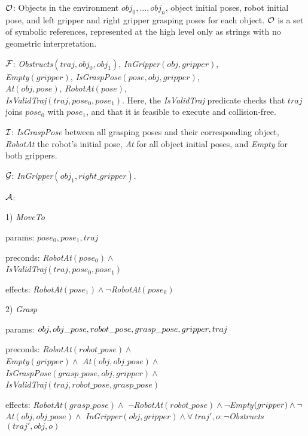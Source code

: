\begin{tightlist}
\item[$\mathcal{O}$:] Objects in the environment $obj_{0}, ..., obj_{n}$, object initial poses,
robot initial pose, and left gripper and right gripper grasping poses
for each object. $\mathcal{O}$ is a set of symbolic references, represented at the high
level only as strings with no geometric interpretation.

\item[$\mathcal{F}$:] \emph{Obstructs}$(traj, obj_{0}, obj_{1})$, \emph{InGripper}$(obj, gripper)$,\\\emph{Empty}$(gripper)$,
\emph{IsGraspPose}$(pose, obj, gripper)$,\\\emph{At}$(obj, pose)$, \emph{RobotAt}$(pose)$,\\
\emph{IsValidTraj}$(traj, pose_{0}, pose_{1})$. Here, the \emph{IsValidTraj} predicate checks that $traj$
joins $pose_{0}$ with $pose_{1}$, and that it is feasible to execute and
collision-free.

\item[$\mathcal{I}$:] \emph{IsGraspPose} between all grasping poses and their corresponding object,
\emph{RobotAt} the robot's initial pose, \emph{At} for all object initial poses, and
\emph{Empty} for both grippers.

\item[$\mathcal{G}$:] \emph{InGripper}$(obj_{1}, right\_gripper)$.

\item[$\mathcal{A}$:]
\begin{tightlist}
\item[1)] \emph{MoveTo}
  \begin{tightlist}
  \item[params:]$pose_{0}, pose_{1}, traj$
  \item[preconds:]\emph{RobotAt}$(pose_{0}) \wedge$\\ \emph{IsValidTraj}$(traj, pose_{0}, pose_{1})$
  \item[effects:]\emph{RobotAt}$(pose_{1}) \wedge \lnot$\emph{RobotAt}$(pose_{0})$
  \end{tightlist}
\item[2)] \emph{Grasp}
  \begin{tightlist}
  \item[params:]$obj, obj\_pose, robot\_pose,\\grasp\_pose, gripper, traj$
  \item[preconds:]\emph{RobotAt}$(robot\_pose) \wedge$\\ \emph{Empty}$(gripper) \wedge$
\emph{At}$(obj, obj\_pose) \wedge$\\ \emph{IsGraspPose}$(grasp\_pose, obj, gripper) \wedge$\\ \emph{IsValidTraj}$(traj, robot\_pose, grasp\_pose)$
  \item[effects:]\emph{RobotAt}$(grasp\_pose) \wedge$ $\lnot$\emph{RobotAt}$(robot\_pose) \wedge \lnot$\emph{Empty}$(gripper) \wedge\\
\lnot$\emph{At}$(obj, obj\_pose) \wedge$ \emph{InGripper}$(obj, gripper) \wedge \forall\ traj', o: \lnot$\emph{Obstructs}$(traj', obj, o)$
  \end{tightlist}
\end{tightlist}
\end{tightlist}

